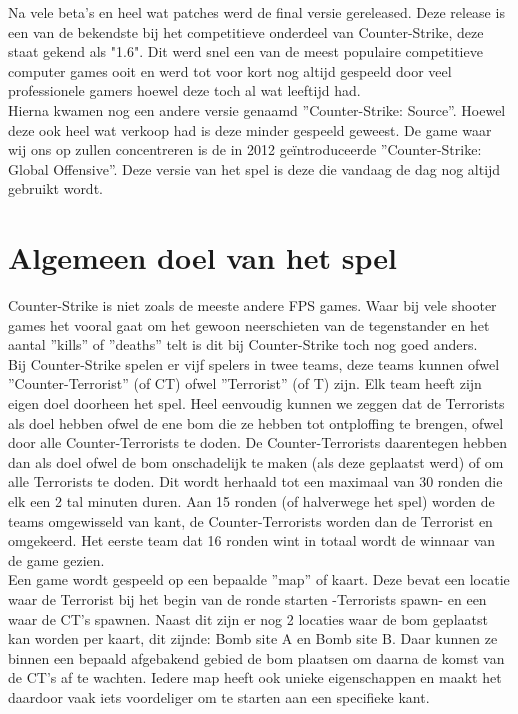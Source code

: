 \documentclass[pdftex,a4paper,12pt,twoside]{report}
\begin{document}
Na vele beta's en heel wat patches werd de final versie gereleased. Deze release is een van de bekendste bij het competitieve onderdeel van Counter-Strike, deze staat gekend als "1.6". Dit werd snel een van de meest populaire competitieve computer games ooit en werd tot voor kort nog altijd gespeeld door veel professionele gamers hoewel deze toch al wat leeftijd had.
\citep{dusttodust}
\\

Hierna kwamen nog een andere versie genaamd ''Counter-Strike: Source''. Hoewel deze ook heel wat verkoop had is deze minder gespeeld geweest. De game waar wij ons op zullen concentreren is de in 2012 geïntroduceerde ''Counter-Strike: Global Offensive''. Deze versie van het spel is deze die vandaag de dag nog altijd gebruikt wordt.

\section{Algemeen doel van het spel}
\label{sec:algemeen doel van het spel}
Counter-Strike is niet zoals de meeste andere FPS games. Waar bij vele shooter games het vooral gaat om het gewoon neerschieten van de tegenstander en het aantal ''kills'' of ''deaths'' telt is dit bij Counter-Strike toch nog goed anders.
\\

Bij Counter-Strike spelen er vijf spelers in twee teams, deze teams kunnen ofwel ''Counter-Terrorist'' (of CT) ofwel ''Terrorist'' (of T) zijn. Elk team heeft zijn eigen doel doorheen het spel. Heel eenvoudig kunnen we zeggen dat de Terrorists als doel hebben ofwel de ene bom die ze hebben tot ontploffing te brengen, ofwel door alle Counter-Terrorists te doden. 
De Counter-Terrorists daarentegen hebben dan als doel ofwel de bom onschadelijk te maken (als deze geplaatst werd) of om alle Terrorists te doden. Dit wordt herhaald tot een maximaal van 30 ronden die elk een 2 tal minuten duren. Aan 15 ronden (of halverwege het spel) worden de teams omgewisseld van kant, de Counter-Terrorists worden dan de Terrorist en omgekeerd. Het eerste team dat 16 ronden wint in totaal wordt de winnaar van de game gezien.
\\

Een game wordt gespeeld op een bepaalde ''map'' of kaart. Deze bevat een locatie waar de Terrorist bij het begin van de ronde starten -Terrorists spawn- en een waar de CT's spawnen. Naast dit zijn er nog 2 locaties waar de bom geplaatst kan worden per kaart, dit zijnde: Bomb site A en Bomb site B. Daar kunnen ze binnen een bepaald afgebakend gebied de bom plaatsen om daarna de komst van de CT's af te wachten. Iedere map heeft ook unieke eigenschappen en maakt het daardoor vaak iets voordeliger om te starten aan een specifieke kant.
\\
\end{document}
